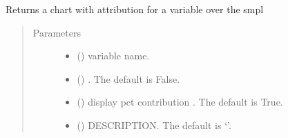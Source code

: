 \documentclass[letterpaper,10pt,english]{sphinxmanual}
\begin{document}
\begin{fulllineitems}
\begin{fulllineitems}
\end{fulllineitems}


\begin{fulllineitems}
\label{\detokenize{index:modelclass.Dekomp_Mixin.dekomp_plot}}
\pysigstartsignatures
{}
\pysigstopsignatures
\sphinxAtStartPar
Returns  a chart with attribution for a variable over the smpl
\begin{quote}\begin{description}
\item[{Parameters}] \leavevmode\begin{itemize}
\item {} 
\sphinxAtStartPar
{} () \textendash{} variable name.

\item {} 
\sphinxAtStartPar
{} (\sphinxstyleliteralemphasis{\sphinxupquote{, }}) \textendash{} . The default is False.

\item {} 
\sphinxAtStartPar
{} (\sphinxstyleliteralemphasis{\sphinxupquote{, }}) \textendash{} display pct contribution . The default is True.

\item {} 
\sphinxAtStartPar
{} (\sphinxstyleliteralemphasis{\sphinxupquote{, }}) \textendash{} DESCRIPTION. The default is ‘’.


\end{itemize}
\end{description}
\end{quote}
\end{fulllineitems}
\end{fulllineitems}
\end{document}
